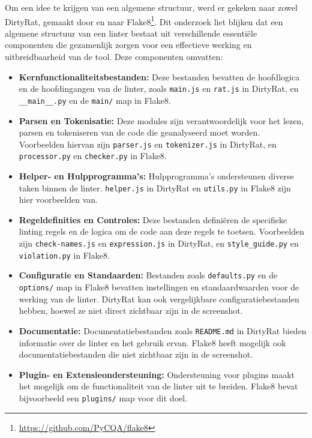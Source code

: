 Om een idee te krijgen van een algemene structuur, werd er gekeken naar zowel DirtyRat, gemaakt door \textcite{BorgesLate2021} en naar Flake8\footnote{\url{https://github.com/PyCQA/flake8}}. Dit onderzoek liet blijken dat een algemene structuur van een linter bestaat uit verschillende essentiële componenten die gezamenlijk zorgen voor een effectieve werking en uitbreidbaarheid van de tool. Deze componenten omvatten:

\begin{itemize}
    \item \textbf{Kernfunctionaliteitsbestanden:} Deze bestanden bevatten de hoofdlogica en de hoofdingangen van de linter, zoals \texttt{main.js} en \texttt{rat.js} in DirtyRat, en \texttt{\_\_main\_\_.py} en de \texttt{main/} map in Flake8.
    
    \item \textbf{Parsen en Tokenisatie:} Deze modules zijn verantwoordelijk voor het lezen, parsen en tokeniseren van de code die geanalyseerd moet worden. Voorbeelden hiervan zijn \texttt{parser.js} en \texttt{tokenizer.js} in DirtyRat, en \texttt{processor.py} en \texttt{checker.py} in Flake8.
    
    \item \textbf{Helper- en Hulpprogramma's:} Hulpprogramma's ondersteunen diverse taken binnen de linter. \texttt{helper.js} in DirtyRat en \texttt{utils.py} in Flake8 zijn hier voorbeelden van.
    
    \item \textbf{Regeldefinities en Controles:} Deze bestanden definiëren de specifieke linting regels en de logica om de code aan deze regels te toetsen. Voorbeelden zijn \texttt{check-names.js} en \texttt{expression.js} in DirtyRat, en \texttt{style\_guide.py} en \texttt{violation.py} in Flake8.
    
    \item \textbf{Configuratie en Standaarden:} Bestanden zoals \texttt{defaults.py} en de \texttt{options/} map in Flake8 bevatten instellingen en standaardwaarden voor de werking van de linter. DirtyRat kan ook vergelijkbare configuratiebestanden hebben, hoewel ze niet direct zichtbaar zijn in de screenshot.
    
    \item \textbf{Documentatie:} Documentatiebestanden zoals \texttt{README.md} in DirtyRat bieden informatie over de linter en het gebruik ervan. Flake8 heeft mogelijk ook documentatiebestanden die niet zichtbaar zijn in de screenshot.
    
    \item \textbf{Plugin- en Extensieondersteuning:} Ondersteuning voor plugins maakt het mogelijk om de functionaliteit van de linter uit te breiden. Flake8 bevat bijvoorbeeld een \texttt{plugins/} map voor dit doel.
\end{itemize}

